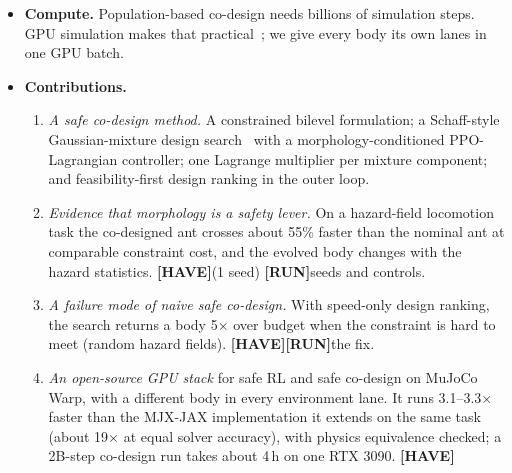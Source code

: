 \documentclass[sigconf,review]{acmart}
\newcommand{\statustag}[2]{\textcolor{#1}{\textsf{\scriptsize\bfseries[#2]}}}
\newcommand{\HAVE}{\statustag{teal!70!black}{HAVE}\hspace{0.3em}}
\newcommand{\RUN}{\statustag{red!75!black}{RUN}\hspace{0.3em}}
\begin{document}
\begin{itemize}
  \begin{enumerate}
  \item \emph{Inner.} The budget must hold for every body, not on average over the population the shared policy trains on; otherwise a reckless body can hide behind safe ones.
  \item \emph{Outer.} Ranking designs by speed assumes the inner loop has already met the budget. When it has not, the search selects fast, unsafe bodies, which we observe (Sec.~\ref{sec:res-outer}). This is the classic constraint-handling problem of evolutionary computation~\cite{deb2000efficient,runarsson2000stochastic,coello2002theoretical}, with one twist: feasibility is a noisy estimate that depends on a controller that is still learning.
  \end{enumerate}
\item \textbf{Compute.} Population-based co-design needs billions of simulation steps. GPU simulation makes that practical~\cite{freeman2021brax,makoviychuk2021isaac,zakka2025playground}; we give every body its own lanes in one GPU batch.
\item \textbf{Contributions.}
  \begin{enumerate}
  \item \emph{A safe co-design method.} A constrained bilevel formulation; a Schaff-style Gaussian-mixture design search~\cite{schaff2019jointly} with a morphology-conditioned PPO-Lagrangian controller; one Lagrange multiplier per mixture component; and feasibility-first design ranking in the outer loop.
  \item \emph{Evidence that morphology is a safety lever.} On a hazard-field locomotion task the co-designed ant crosses about 55\% faster than the nominal ant at comparable constraint cost, and the evolved body changes with the hazard statistics. \HAVE (1 seed) \RUN seeds and controls.
  \item \emph{A failure mode of naive safe co-design.} With speed-only design ranking, the search returns a body 5$\times$ over budget when the constraint is hard to meet (random hazard fields). \HAVE \RUN the fix.
  \item \emph{An open-source GPU stack} for safe RL and safe co-design on MuJoCo Warp, with a different body in every environment lane. It runs 3.1--3.3$\times$ faster than the MJX-JAX implementation it extends on the same task (about 19$\times$ at equal solver accuracy), with physics equivalence checked; a 2B-step co-design run takes about 4\,h on one RTX 3090. \HAVE
  \end{enumerate}
\end{itemize}
\end{document}
